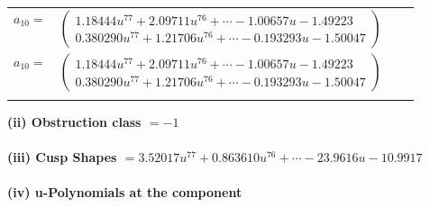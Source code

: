 \documentclass[1p]{elsarticle_modified}
\theoremstyle{definition}
\begin{document}
\begin{tabular}{m{7pt} m{180pt} m{7pt} m{180pt} }
\flushright $a_{10}=$&$\begin{pmatrix}1.18444 u^{77}+2.09711 u^{76}+\cdots-1.00657 u-1.49223\\0.380290 u^{77}+1.21706 u^{76}+\cdots-0.193293 u-1.50047\end{pmatrix}$\\ \flushright $a_{10}=$&$\begin{pmatrix}1.18444 u^{77}+2.09711 u^{76}+\cdots-1.00657 u-1.49223\\0.380290 u^{77}+1.21706 u^{76}+\cdots-0.193293 u-1.50047\end{pmatrix}$\\&\end{tabular}
\flushleft \textbf{(ii) Obstruction class $= -1$}\\~\\
\flushleft \textbf{(iii) Cusp Shapes $= 3.52017 u^{77}+0.863610 u^{76}+\cdots-23.9616 u-10.9917$}\\~\\
\newpage\renewcommand{\arraystretch}{1}
\flushleft \textbf{(iv) u-Polynomials at the component}\newline \\
\end{document}

